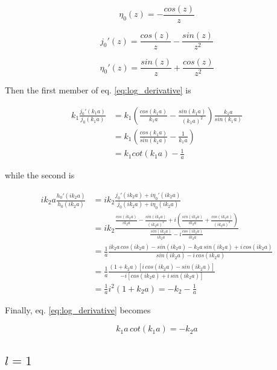 \documentclass{article}
\begin{document}
\begin{equation}
\eta_0(z) = - \frac{cos(z)}{z}
\end{equation}

\begin{equation}
j_0'(z) = \frac{cos(z)}{z} -  \frac{sin(z)}{z^2}
\end{equation}

\begin{equation}
\eta_0'(z) = \frac{sin(z)}{z} + \frac{cos(z)}{z^2}
\end{equation}

Then the first member of eq. \eqref{eq:log_derivative} is

\begin{align}
k_1 \frac{j_0'(k_1a)}{j_0(k_1a)} & = k_1 \left( \frac{cos(k_1a)}{k_1a} - \frac{sin(k_1a)}{(k_1a)^2} \right) \frac{k_1a}{sin(k_1a)} \nonumber \\
& = k_1 \left( \frac{cos(k_1a)}{sin(k_1a)} - \frac{1}{k_1a} \right) \nonumber \\
& = k_1 cot(k_1a) - \frac{1}{a}
\end{align}

while the second is

\begin{align}
ik_2a \frac{h_0'(ik_2a)}{h_0(ik_2a)} & = ik_2 \frac{j_0'(ik_2a) + i \eta_0'(ik_2a)}{j_0(ik_2a) + i\eta_0(ik_2a)} \nonumber \\
& = ik_2 \frac{\frac{cos(ik_2a)}{ik_2a} - \frac{sin(ik_2a)}{(ik_2a)^2} + i \left( \frac{sin(ik_2a)}{ik_2a} + \frac{cos(ik_2a)}{(ik_2a)^2} \right)}{\frac{sin(ik_2a)}{ik_2a} -i \frac{cos(ik_2a)}{ik_2a}} \nonumber \\
& = \frac{1}{a} \frac{ik_2a \, cos(ik_2a) - sin(ik_2a) - k_2a \, sin(ik_2a) + i \, cos(ik_2a)}{sin(ik_2a) - i \, cos(ik_2a)} \nonumber \\
& = \frac{1}{a} \frac{(1+k_2a) \left[ i \, cos(ik_2a) - sin(ik_2a) \right]}{-i \left[ cos(ik_2a) + i \, sin(ik_2a) \right]} \nonumber \\
& = \frac{1}{a} i^2 (1 + k_2a) = -k_2 - \frac{1}{a}
\end{align}

Finally, eq. \eqref{eq:log_derivative} becomes

\begin{equation}
k_1a \, cot(k_1a) = -k_2a
\end{equation}

\subsection{\(l=1\)}
\end{document}
